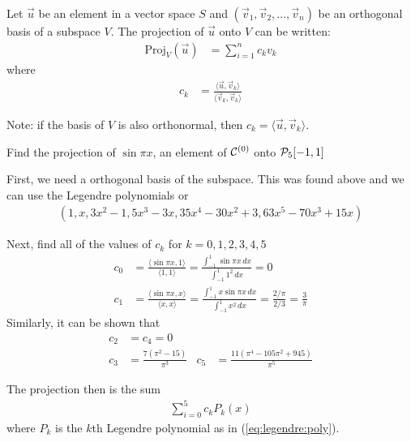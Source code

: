 \begin{Boxed*}
Let $\vec{u}$ be an element in a vector space $S$ and $( \vec{v}_1, \vec{v}_2, \ldots, \vec{v}_n )$ be an orthogonal basis of a subspace $V$.  The projection of $\vec{u}$ onto $V$ can be written:
\begin{align*}
\text{Proj}_V (\vec{u}) & = \sum_{i=1}^n c_k v_k 
\end{align*}
where
\begin{align*}
c_k & = \frac{\langle \vec{u}, \vec{v}_k \rangle}{\langle \vec{v}_k, \vec{v}_k \rangle}
\end{align*}

Note: if the basis of $V$ is also orthonormal, then $c_k = \langle \vec{u}, \vec{v}_k \rangle$.  
\end{Boxed*}


\begin{example}
Find the projection of $\sin \pi x$, an element of ${\cal C}^{(0)}$ onto ${\cal P}_5[-1,1]$ 

\solution

First, we need a orthogonal basis of the subspace.  This was found above and we can use the Legendre polynomials or
\begin{align}
(1,x,3x^2-1,5x^3-3x,35x^4-30x^2+3,63x^5-70x^3+15x) \label{eq:legendre:poly}
\end{align}

Next, find all of the values of $c_k$ for $k=0,1,2,3,4,5$
\begin{align*}
c_0 & = \frac{\langle \sin \pi x, 1 \rangle }{\langle 1, 1 \rangle} = \frac{\int_{-1}^1 \sin \pi x \, dx}{\int_{-1}^1 1^2 \, dx} = 0 \\
c_1 & = \frac{\langle \sin \pi x, x \rangle }{\langle x, x \rangle} = \frac{\int_{-1}^1 x \sin \pi x \, dx}{\int_{-1}^1 x^2 \, dx} = \frac{2/\pi}{2/3} =\frac{3}{\pi}
\end{align*}
Similarly, it can be shown that 
\begin{align*}
c_2 & = c_4 = 0 \\
c_3 & = \frac{7(\pi^2-15)}{\pi^3} & c_5 & = \frac{11(\pi^4-105\pi^2+945)}{\pi^5}
\end{align*}

The projection then is the sum
%
\begin{align*}
\sum_{i=0}^5 c_k P_k(x)
\end{align*}
where $P_k$ is the $k$th Legendre polynomial as in (\ref{eq:legendre:poly}).  


\end{example}
